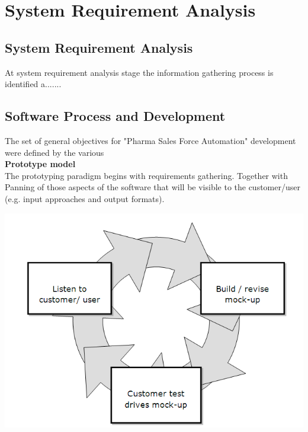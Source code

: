 \chapter{System Requirement Analysis}


\section{System Requirement Analysis}
 At system requirement analysis stage the information gathering process is identified a.......





\section{Software Process and Development}
The set of general objectives for "Pharma Sales Force Automation" development were defined by the various \\
\textbf{Prototype model}\\

The prototyping paradigm begins with requirements gathering. Together with Panning of those aspects of the software that will be visible to the customer/user (e.g. input approaches and output formats).


\includegraphics[scale=0.8]{Ch2/prototype.png}

